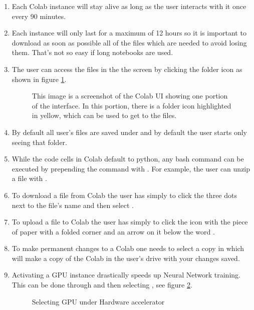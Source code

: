 \begin{enumerate}
    \item Each Colab instance will stay alive as long as the user interacts with it once every 90 minutes.
    \item Each instance will only last for a maximum of 12 hours so it is important to download as soon as possible all of the files which are needed to avoid losing them. That's not so easy if long notebooks are used.
    \item The user can access the files in the the screen by clicking the folder icon as shown in figure \ref{ColabScreenShot}. 
    
    \begin{figure}
        \caption[Screenshot of the Colab UI]{This image is a screenshot of the Colab UI showing one portion of the interface.  In this portion, there is a folder icon highlighted in yellow, which can be used to get to the files.}\label{ColabScreenShot}
    \end{figure}  
    
    
    
    
    \item By default all user's files are saved under  and by default the user starts only seeing that folder. 
    \item While the code cells in Colab default to python, any bash command can be executed by prepending the command with \PYTHON{!}. For example, the user can unzip a file with .
    \item To download a file from Colab  the user has simply to click the three dots next to the file's name and then select .
    \item To upload a file to Colab the user has  simply to click the icon with the piece of paper with a folded corner and an arrow on it below the word .
    \item To make permanent changes to a Colab one needs to select  a copy in  which will make a copy of the Colab in the user's drive with your changes saved.
    \item Activating a GPU instance drastically speeds up Neural Network training. This can be done through  and then selecting , see figure \ref{ColabGPU}.
    
    \begin{figure}
        \caption{Selecting GPU under Hardware accelerator}\label{ColabGPU}
    \end{figure}  
    
\end{enumerate}



